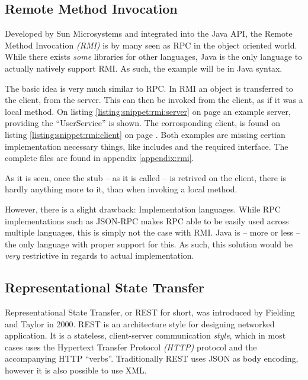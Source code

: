 		\subsection{Remote Method Invocation}
			Developed by Sun Microsystems and integrated into the Java API\cite{Downing:1998:JRR:522413}, the Remote Method Invocation \emph{(RMI)} is by many seen as RPC in the object oriented world. While there exists \emph{some} libraries for other languages, Java is the only language to actually natively support RMI. As such, the example will be in Java syntax.

			The basic idea is very much similar to RPC. In RMI an object is transferred to the client, from the server. This can then be invoked from the client, as if it was a local method. On listing \ref{listing:snippet:rmi:server} on page \pageref{listing:snippet:rmi:server} an example server, providing the ``UserService'' is shown. The corrosponding client, is found on listing \ref{listing:snippet:rmi:client} on page \pageref{listing:snippet:rmi:client}. Both examples are missing certian implementation necessary things, like includes and the required interface. The complete files are found in appendix \ref{appendix:rmi}.

			As it is seen, once the stub -- as it is called -- is retrived on the client, there is hardly anything more to it, than when invoking a local method.

			

			

			However, there is a slight drawback: Implementation languages. While RPC implementations such as JSON-RPC makes RPC able to be easily used across multiple languages, this is simply not the case with RMI. Java is -- more or less -- the only language with proper support for this. As such, this solution would be \emph{very} restrictive in regards to actual implementation.

		\subsection{Representational State Transfer}
			\label{sec:design:rest}
			Representational State Transfer, or REST for short, was introduced by Fielding and Taylor \cite{Fielding:2000:PDM:337180.337228} in 2000. REST is an architecture style for designing networked application. It is a stateless, client-server communication \emph{style}, which in most cases uses the Hypertext Transfer Protocol \emph{(HTTP)} protocol and the accompanying HTTP ``verbs''. Traditionally REST uses JSON as body encoding, however it is also possible to use XML.

